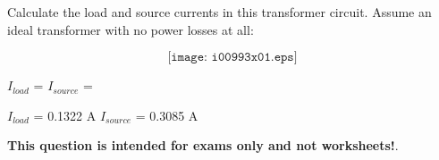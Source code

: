 

Calculate the load and source currents in this transformer circuit.  Assume an ideal transformer with no power losses at all:

$$\texttt{[image: i00993x01.eps]}$$

$I_{load}$ = \hskip 80pt $I_{source}$ = 

\vskip 10pt







$I_{load}$ = 0.1322 A \hskip 80pt $I_{source}$ = 0.3085 A







{\bf This question is intended for exams only and not worksheets!}.




